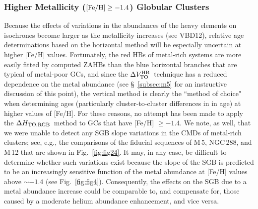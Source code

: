 \documentclass[12pt,preprint]{aastex}
\newcommand\delv{\Delta V^{\rm HB}_{\rm TO}}
\newcommand\delc{\Delta H_{\rm TO,RGB}}
\begin{document}


\subsubsection{Higher Metallicity (${\rm [Fe/H]} \ge -1.4$) Globular Clusters} 
\label{subsubsec:red}

Because the effects of variations in the abundances of the heavy elements on
isochrones become larger as the metallicity increases (see VBD12), relative
age determinations based on the horizontal method will be especially uncertain
at higher [Fe/H] values.  Fortunately, the red HBs of metal-rich systems are
more easily fitted by computed ZAHBs than the blue horizontal branches that are
typical of metal-poor GCs, and since the $\delv$\ technique has a reduced
dependence on the metal abundance (see \S~\ref{subsec:m5} for an instructive
discussion of this point), the vertical method is clearly the ``method of
choice" when determining ages (particularly cluster-to-cluster differences in
in age) at higher values of [Fe/H].  For these reasons, no attempt has been made
to apply the $\delc$\ method to GCs that have [Fe/H] $\ge -1.4$.  We note, as
well, that we were unable to detect any SGB slope variations in the CMDs of
metal-rich clusters; see, e.g., the comparisons of the fiducial sequences of
M$\,$5, NGC$\,$288, and M$\,$12 that are shown in Fig.~\ref{fig:fig24}.
It may, in any case, be difficult to determine whether such variations exist
because the slope of the SGB is predicted to be an increasingly sensitive
function of the metal abundance at [Fe/H] values above $\sim -1.4$ (see
Fig.~\ref{fig:fig4}).  Consequently, the effects on the SGB due to a metal
abundance increase could be comparable to, and compensate for, those caused by
a moderate helium abundance enhancement, and vice versa.  
\end{document}
